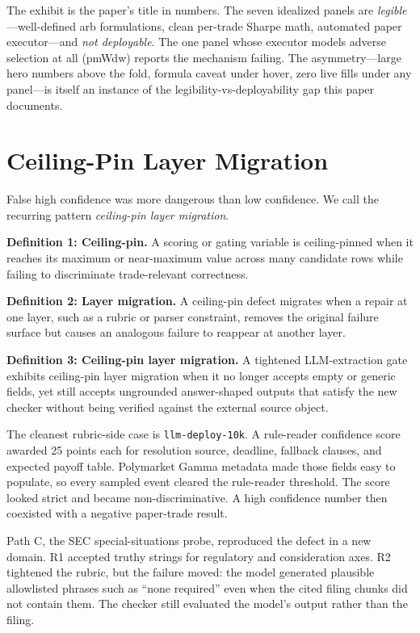 \documentclass[11pt]{article}
\begin{document}
The exhibit is the paper's title in numbers. The seven idealized panels are \emph{legible}---well-defined arb formulations, clean per-trade Sharpe math, automated paper executor---and \emph{not deployable}. The one panel whose executor models adverse selection at all (pmWdw) reports the mechanism failing. The asymmetry---large hero numbers above the fold, formula caveat under hover, zero live fills under any panel---is itself an instance of the legibility-vs-deployability gap this paper documents.

\section{Ceiling-Pin Layer Migration}

False high confidence was more dangerous than low confidence. We call the recurring pattern \emph{ceiling-pin layer migration}.

\textbf{Definition 1: Ceiling-pin.} A scoring or gating variable is ceiling-pinned when it reaches its maximum or near-maximum value across many candidate rows while failing to discriminate trade-relevant correctness.

\textbf{Definition 2: Layer migration.} A ceiling-pin defect migrates when a repair at one layer, such as a rubric or parser constraint, removes the original failure surface but causes an analogous failure to reappear at another layer.

\textbf{Definition 3: Ceiling-pin layer migration.} A tightened LLM-extraction gate exhibits ceiling-pin layer migration when it no longer accepts empty or generic fields, yet still accepts ungrounded answer-shaped outputs that satisfy the new checker without being verified against the external source object.

The cleanest rubric-side case is \texttt{llm-deploy-10k}. A rule-reader confidence score awarded 25 points each for resolution source, deadline, fallback clauses, and expected payoff table. Polymarket Gamma metadata made those fields easy to populate, so every sampled event cleared the rule-reader threshold. The score looked strict and became non-discriminative. A high confidence number then coexisted with a negative paper-trade result.

Path C, the SEC special-situations probe, reproduced the defect in a new domain. R1 accepted truthy strings for regulatory and consideration axes. R2 tightened the rubric, but the failure moved: the model generated plausible allowlisted phrases such as ``none required'' even when the cited filing chunks did not contain them. The checker still evaluated the model's output rather than the filing.
\end{document}
